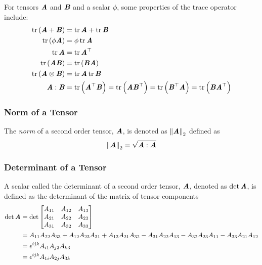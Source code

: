 For tensors $\boldsymbol{\mathit{A}}$ and $\boldsymbol{\mathit{B}}$ and a scalar $\phi$, some properties of the trace operator include:
\begin{align}
  \trace{}{\pbrac{\tensor{A}+\tensor{B}}}&=\trace{}{\tensor{A}}+\trace{}{\tensor{B}}\\
  \trace{}{\pbrac{\phi\tensor{A}}}&=\phi\trace{}{\tensor{A}} \\
  \trace{}{\tensor{A}}&=\trace{}{\transpose{\tensor{A}}} \\
  \trace{}{\pbrac{\tensor{A}\tensor{B}}}&=\trace{}{\pbrac{\tensor{B}\tensor{A}}}\\
  \trace{}{\pbrac{\tensorprod{\tensor{A}}{\tensor{B}}}}&=\trace{}{\tensor{A}}\trace{}{\tensor{B}}\\
  \doubledotprod{\tensor{A}}{\tensor{B}}&=\trace{}{\pbrac{\transpose{\tensor{A}}\tensor{B}}}=\trace{}{\pbrac{\tensor{A}\transpose{\tensor{B}}}}=\trace{}{\pbrac{\transpose{\tensor{B}}\tensor{A}}}=\trace{}{\pbrac{\tensor{B}\transpose{\tensor{A}}}}
\end{align}


\subsubsection{Norm of a Tensor}
\label{subsubsec:NormTensorSecondOrder}

The \emph{norm} of a second order tensor, $\boldsymbol{\mathit{A}}$, is denoted as
$ {\left\| \boldsymbol{\mathit{A}} \right\|_{2}} $ defined as
\begin{equation}
  \norm{\tensortwo{A}}=\sqrt{\doubledotprod{\tensortwo{A}}{\tensortwo{A}}}
\label{eqn:DefinitionNormTensorSecondOrder}
\end{equation}

\subsubsection{Determinant of a Tensor}
\label{subsubsec:DeterminantTensorSecondOrder}

A scalar called the determinant of a second order tensor, $\boldsymbol{\mathit{A}}$, denoted as
$\det \boldsymbol{\mathit{A}}$, is defined as the determinant of the matrix of
tensor components \ie
\begin{equation}
  \begin{aligned}
    \determinant{\tensortwo{A}}&=\determinant{\begin{bmatrix}
        A_{11} & A_{12} & A_{13} \\
        A_{21} & A_{22} & A_{23} \\
        A_{31} & A_{32} & A_{33}
    \end{bmatrix}}\\
    &=A_{11}A_{22}A_{33}+A_{12}A_{23}A_{31}+A_{13}A_{21}A_{32}-A_{31}A_{22}A_{13}-A_{32}A_{23}A_{11}-A_{33}A_{21}A_{12}\\
    &=\sharplevicita{i}{j}{k}A_{i1}A_{j2}A_{k3}\\
    &=\sharplevicita{i}{j}{k}A_{1i}A_{2j}A_{3k}
  \end{aligned}
  \label{eqn:DefinitionDeterminantTensorSecondOrder}
\end{equation}

